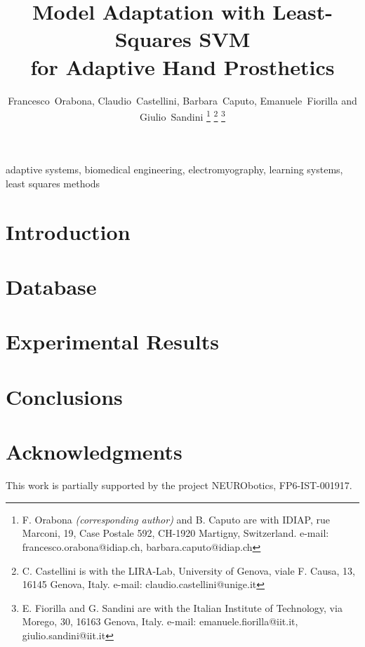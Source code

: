 \documentclass[conference,letterpaper]{IEEEtran}
\begin{document}

\title{Model Adaptation with Least-Squares SVM\\for Adaptive Hand Prosthetics}

\author{Francesco~Orabona, Claudio~Castellini, Barbara~Caputo, Emanuele~Fiorilla and Giulio~Sandini
\thanks{F. Orabona \emph{(corresponding author)} and B. Caputo
  are with IDIAP,
  rue Marconi, 19, Case Postale 592, CH-1920 Martigny, Switzerland.
  e-mail: francesco.orabona@idiap.ch, barbara.caputo@idiap.ch}%
\thanks{C. Castellini
  is with the LIRA-Lab, University of Genova,
  viale F. Causa, 13, 16145 Genova, Italy.
  e-mail: claudio.castellini@unige.it}%
\thanks{E. Fiorilla and G. Sandini
  are with the Italian Institute of Technology,
  via Morego, 30, 16163 Genova, Italy.
  e-mail: emanuele.fiorilla@iit.it, giulio.sandini@iit.it}%
}

\maketitle

\begin{abstract}
  
\end{abstract}

\begin{IEEEkeywords}
  adaptive systems, biomedical engineering, electromyography,
  learning systems, least squares methods
\end{IEEEkeywords}

\IEEEpeerreviewmaketitle


\section{Introduction}
\label{sec:intro}


\section{Database}
\label{sec:mms}


\section{Experimental Results}
\label{sec:exp}


\section{Conclusions}
\label{sec:concl}



\section*{Acknowledgments}

This work is partially supported by the project NEURObotics,
FP6-IST-001917.

{\small


}
\end{document}
